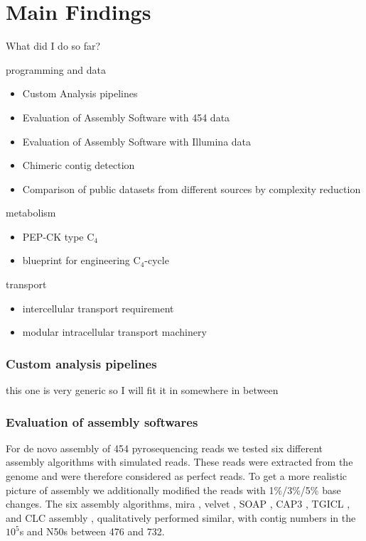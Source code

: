 \chapter{Main Findings} %

What did I do so far?

programming and data
\begin{itemize}
	\item Custom Analysis pipelines
	\item Evaluation of  Assembly Software with 454 data
	\item Evaluation of Assembly Software with Illumina data
	\item Chimeric contig detection
	\item Comparison of public datasets from different sources by complexity reduction
\end{itemize}

metabolism
\begin{itemize}
	\item {} PEP-CK type C$_4$
	\item {} blueprint for engineering C$_4$-cycle
\end{itemize}
	
transport
\begin{itemize}
	\item {} intercellular transport requirement
	\item {} modular intracellular transport machinery
\end{itemize}



\subsection{Custom analysis pipelines}
this one is very generic so I will fit it in somewhere in between
\subsection{Evaluation of assembly softwares}
For de novo assembly of 454 pyrosequencing reads we tested six different assembly algorithms with simulated reads. These reads were extracted from the  genome and were therefore considered as perfect reads. To get a more realistic picture of assembly we additionally modified the reads with 1\%/3\%/5\%  base changes.
The six assembly algorithms, mira \cite{unknown}, velvet \cite{unknown}, SOAP \cite{unknown}, CAP3 \cite{unknown}, TGICL \cite{unknown}, and CLC  assembly \cite{unknown}, qualitatively performed similar, with contig numbers in the $10^5$s and N50s between 476 and 732.

